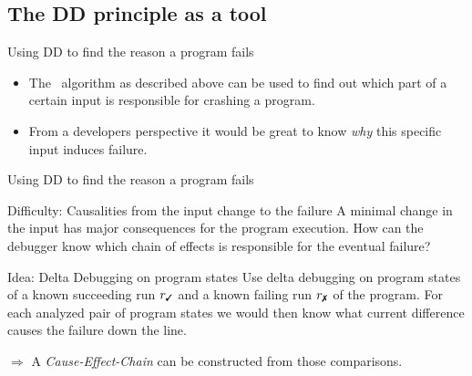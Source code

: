 \subsection{The DD principle as a tool}
\begin{frame}{Using DD to find the reason a program fails}
	\begin{itemize}
		\item The \ddp\ algorithm as described above can be used to find out which part of a certain input is responsible for crashing a program.
		\item From a developers perspective it would be great to know \textit{why} this specific input induces failure.
	\end{itemize}


\end{frame}

\begin{frame}{Using DD to find the reason a program fails}
	\begin{alertblock}{Difficulty: Causalities from the input change to the failure}
		A minimal change in the input has major consequences for the program execution. How can the debugger know which chain of effects is responsible for the eventual failure?
	\end{alertblock}

	\pause

	\begin{exampleblock}{Idea: Delta Debugging on program states}
		Use delta debugging on program states of a known succeeding run $r_\cmark$ and a known failing run $r_\xmark$ of the program. For each analyzed pair of program states we would then know what current difference causes the failure down the line.

		\bigskip

		$\Rightarrow$ A \textit{Cause-Effect-Chain} can be constructed from those comparisons.
	\end{exampleblock}	
\end{frame}

